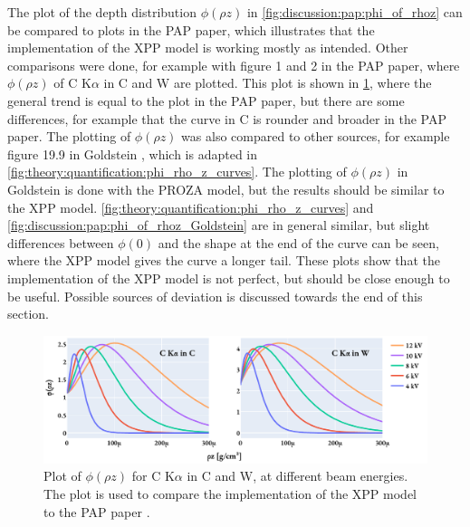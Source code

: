 The plot of the depth distribution $\phi(\rho z)$ in \cref{fig:discussion:pap:phi_of_rhoz} can be compared to plots in the PAP paper\cite{pap_1991}, which illustrates that the implementation of the XPP model is working mostly as intended.
Other comparisons were done, for example with figure 1 and 2 in the PAP paper, where $\phi(\rho z)$ of C K$\alpha$ in C and W are plotted.
This plot is shown in \cref{fig:discussion:pap:phi_of_rhoz_C_Ka}, where the general trend is equal to the plot in the PAP paper, but there are some differences, for example that the curve in C is rounder and broader in the PAP paper.
The plotting of $\phi(\rho z)$ was also compared to other sources, for example figure 19.9 in Goldstein \cite[Fig. 19.9]{goldstein_scanning_2018}, which is adapted in \cref{fig:theory:quantification:phi_rho_z_curves}.
The plotting of $\phi(\rho z)$ in Goldstein is done with the PROZA model, but the results should be similar to the XPP model.
\cref{fig:theory:quantification:phi_rho_z_curves} and \cref{fig:discussion:pap:phi_of_rhoz_Goldstein} are in general similar, but slight differences between $\phi(0)$ and the shape at the end of the curve can be seen, where the XPP model gives the curve a longer tail.
These plots show that the implementation of the XPP model is not perfect, but should be close enough to be useful.
Possible sources of deviation is discussed towards the end of this section.

\begin{figure}[htbp]
    \centering
    \includegraphics[width=0.99\linewidth]{figures/discussion/PAP_phi_of_rhoz_C_Ka.pdf}
    \caption{
        Plot of $\phi(\rho z)$ for C K$\alpha$ in C and W, at different beam energies.
        The plot is used to compare the implementation of the XPP model to the PAP paper \cite[Fig. 1 and 2]{pap_1991}.
    }
    \label{fig:discussion:pap:phi_of_rhoz_C_Ka}
\end{figure}



